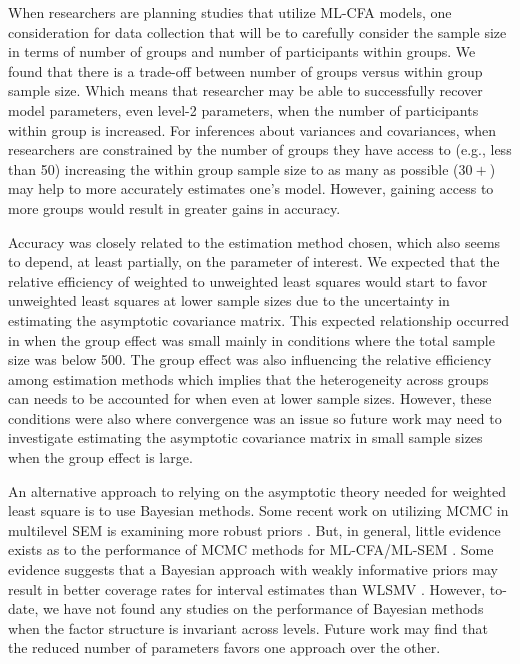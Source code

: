 \documentclass[Review,sageh,times, doublespace]{sagej}
\begin{document}
When researchers are planning studies that utilize ML-CFA models, one consideration for data collection that will be to carefully consider the sample size in terms of number of groups and number of participants within groups.
We found that there is a trade-off between number of groups versus within group sample size. 
Which means that researcher may be able to successfully recover model parameters, even level-2 parameters, when the number of participants within group is increased.
For inferences about variances and covariances, when researchers are constrained by the number of groups they have access to (e.g., less than 50) increasing the within group sample size to as many as possible ($30+$) may help to more accurately estimates one's model.
However, gaining access to more groups would result in greater gains in accuracy.

Accuracy was closely related to the estimation method chosen, which also seems to depend, at least partially, on the parameter of interest.
We expected that the relative efficiency of weighted to 
unweighted least squares would start to favor unweighted least squares at lower sample sizes due to the uncertainty in estimating the asymptotic covariance matrix.
This expected relationship occurred in when the group effect was small mainly in conditions where the total sample size was below 500.
The group effect was also influencing the relative efficiency among estimation methods which implies that the heterogeneity across groups can needs to be accounted for when even at lower sample sizes.
However, these conditions were also where convergence was an issue so future work may need to investigate estimating the asymptotic covariance matrix in small sample sizes when the group effect is large.
 
An alternative approach to relying on the asymptotic theory needed for weighted least square is to use Bayesian methods.
Some recent work on utilizing MCMC in multilevel SEM is examining more robust priors \citep{Erp2020}.
But, in general, little evidence exists as to the performance of MCMC methods for ML-CFA/ML-SEM \cite{Depaoli2015, Hox2012}. 
Some evidence suggests that a Bayesian approach with weakly informative priors may result in better coverage rates for interval estimates than WLSMV \citep{Holtmann2016}.
However, to-date, we have not found any studies on the performance of Bayesian methods when the factor structure is invariant across levels.
Future work may find that the reduced number of parameters favors one approach over the other.
\end{document}
